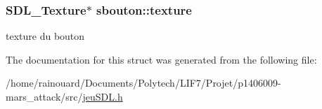 \subsubsection[{\texorpdfstring{texture}{texture}}]{\setlength{\rightskip}{0pt plus 5cm}S\+D\+L\+\_\+\+Texture$\ast$ sbouton\+::texture}\hypertarget{structsbouton_a3d5b47fd9c8a5c6adab155a76d6a50d3}{}\label{structsbouton_a3d5b47fd9c8a5c6adab155a76d6a50d3}
texture du bouton 

The documentation for this struct was generated from the following file\+:\begin{DoxyCompactItemize}
\item 
/home/rainouard/\+Documents/\+Polytech/\+L\+I\+F7/\+Projet/p1406009-\/mars\+\_\+attack/src/\hyperlink{jeuSDL_8h}{jeu\+S\+D\+L.\+h}\end{DoxyCompactItemize}
